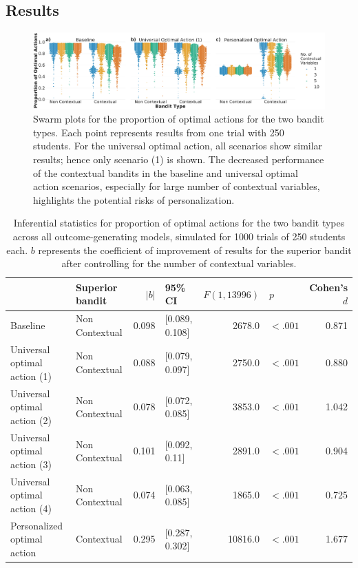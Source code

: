 \subsection{Results}

\begin{figure}[ht]
    \centering
    \includegraphics[width=\textwidth]{figs/NumConvars.pdf}
    \caption{Swarm plots for the proportion of optimal actions for the two bandit types. Each point represents results from one trial with 250 students. For the universal optimal action, all scenarios show similar results; hence only scenario (1) is shown. The decreased performance of the contextual bandits in the baseline and universal optimal action scenarios, especially for large number of contextual variables, highlights the potential risks of personalization.}
    \label{fig:NumConVars}
\end{figure}

\begin{table}[ht]
\begin{tabular*}{\textwidth}{@{\extracolsep{\fill}}llrlrlr}
\toprule
{} & Superior bandit &  $|b|$ &         95\% CI &  $F(1, 13996)$ &       $p$ &  Cohen's $d$ \\
\midrule
Baseline     &  Non Contextual &  0.098 &  [0.089, 0.108] &         2678.0 &  $< .001$ &        0.871 \\
Universal optimal action (1) &  Non Contextual &  0.088 &  [0.079, 0.097] &         2750.0 &  $< .001$ &        0.880 \\
Universal optimal action (2) &  Non Contextual &  0.078 &  [0.072, 0.085] &         3853.0 &  $< .001$ &        1.042 \\
Universal optimal action (3) &  Non Contextual &  0.101 &   [0.092, 0.11] &         2891.0 &  $< .001$ &        0.904 \\
Universal optimal action (4) &  Non Contextual &  0.074 &  [0.063, 0.085] &         1865.0 &  $< .001$ &        0.725 \\
Personalized optimal action       &      Contextual &  0.295 &  [0.287, 0.302] &        10816.0 &  $< .001$ &        1.677 \\
\bottomrule
\end{tabular*}


\caption{Inferential statistics for proportion of optimal actions for the two bandit types across all outcome-generating models, simulated for 1000 trials of 250 students each. $b$ represents the coefficient of improvement of results for the superior bandit after controlling for the number of contextual variables.}
\label{table:resultsNumConVars}

\end{table}

